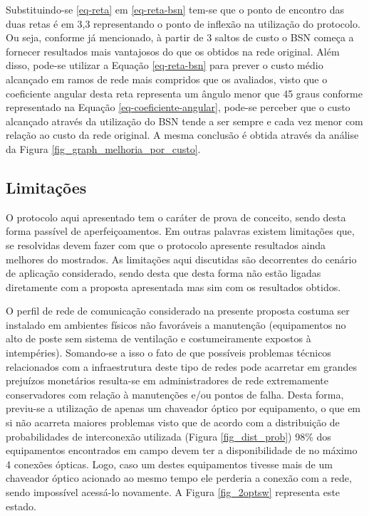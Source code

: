Substituindo-se \ref{eq-reta} em \ref{eq-reta-bsn} tem-se que o ponto de encontro das duas retas é em 3,3 representando o ponto de inflexão na utilização do protocolo. Ou seja, conforme já mencionado, à partir de 3 saltos de custo o BSN começa a fornecer resultados mais vantajosos do que os obtidos na rede original. Além disso, pode-se utilizar a Equação \ref{eq-reta-bsn} para prever o custo médio alcançado em ramos de rede mais compridos que os avaliados, visto que o coeficiente angular desta reta representa um ângulo menor que 45 graus conforme representado na Equação \ref{eq-coeficiente-angular}, pode-se perceber que o custo alcançado através da utilização do BSN tende a ser sempre e cada vez menor com relação ao custo da rede original. A mesma conclusão é obtida através da análise da Figura \ref{fig_graph_melhoria_por_custo}.

\subsection{Limitações}
O protocolo aqui apresentado tem o caráter de prova de conceito, sendo desta forma passível de aperfeiçoamentos. Em outras palavras existem limitações que, se resolvidas devem fazer com que o protocolo apresente resultados ainda melhores do mostrados. As limitações aqui discutidas são decorrentes do cenário de aplicação considerado, sendo desta que desta forma não estão ligadas diretamente com a proposta apresentada mas sim com os resultados obtidos.

O perfil de rede de comunicação considerado na presente proposta costuma ser instalado em ambientes físicos não favoráveis a manutenção (equipamentos no alto de poste sem sistema de ventilação e costumeiramente expostos à intempéries). Somando-se a isso o fato de que possíveis problemas técnicos relacionados com a infraestrutura deste tipo de redes pode acarretar em grandes prejuízos monetários resulta-se em administradores de rede extremamente conservadores com relação à manutenções e/ou pontos de falha. Desta forma, previu-se a utilização de apenas um chaveador óptico por equipamento, o que em si não acarreta maiores problemas visto que de acordo com a distribuição de probabilidades de interconexão utilizada (Figura \ref{fig_dist_prob}) 98\% dos equipamentos encontrados em campo devem ter a disponibilidade de no máximo 4 conexões ópticas. Logo, caso um destes equipamentos tivesse mais de um chaveador óptico acionado ao mesmo tempo ele perderia a conexão com a rede, sendo impossível acessá-lo novamente. A Figura \ref{fig_2optsw} representa este estado.

